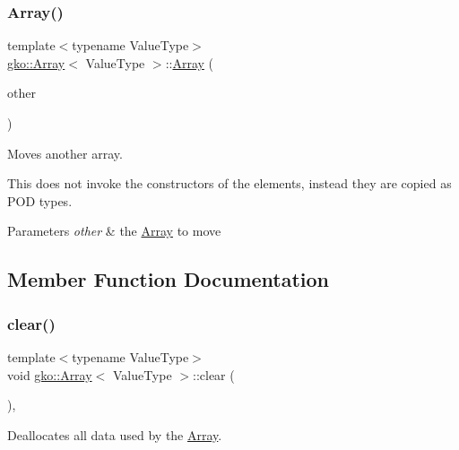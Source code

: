 \subsubsection{\texorpdfstring{Array()}{Array()}\hspace{0.1cm}{\footnotesize\ttfamily [11/11]}}
{\footnotesize\ttfamily template$<$typename Value\+Type$>$ \\
\hyperlink{classgko_1_1Array}{gko\+::\+Array}$<$ Value\+Type $>$\+::\hyperlink{classgko_1_1Array}{Array} (\begin{DoxyParamCaption}\item[{\hyperlink{classgko_1_1Array}{Array}$<$ Value\+Type $>$ \&\&}]{other }\end{DoxyParamCaption})\hspace{0.3cm}{\ttfamily [inline]}}



Moves another array. 

This does not invoke the constructors of the elements, instead they are copied as P\+OD types.


\begin{DoxyParams}{Parameters}
{\em other} & the \hyperlink{classgko_1_1Array}{Array} to move \\
\hline
\end{DoxyParams}


\subsection{Member Function Documentation}
\mbox{\label{classgko_1_1Array_a64f7e9f19c4e8cff8adb402da70476c3}} 
\subsubsection{\texorpdfstring{clear()}{clear()}}
{\footnotesize\ttfamily template$<$typename Value\+Type$>$ \\
void \hyperlink{classgko_1_1Array}{gko\+::\+Array}$<$ Value\+Type $>$\+::clear (\begin{DoxyParamCaption}{ }\end{DoxyParamCaption})\hspace{0.3cm}{\ttfamily [inline]}, {\ttfamily [noexcept]}}



Deallocates all data used by the \hyperlink{classgko_1_1Array}{Array}. 

